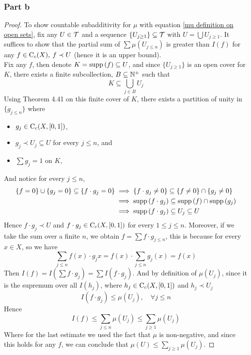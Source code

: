 \documentclass[../../main.tex]{subfiles}
\begin{document}
\subsubsection{Part b}
\begin{proof}
To show countable subadditivity for $\mu$ with equation \eqref{mu definition on open sets}, fix any $U\in\mathcal{T}$ and a sequence $\{U_{j\geq 1}\}\subseteq \mathcal{T}$ with $U = \bigcup U_{j\geq 1}$. It suffices to show that the partial sum of $\sum \mu(U_{j\leq n})$ is greater than $I(f)$ for any $f\in\operatorname{C}_c({X}),\:f\prec U$ (hence it is an upper bound).\\

Fix any $f$, then denote $K=\operatorname{supp}{(f)}\subseteq U$, and since $\{U_{j\geq 1}\}$ is an open cover for $K$, there exists a finite subcollection, $B\subseteq\mathbb{N}^+$ such that 
\[
K\subseteq \bigcup_{j\in B}U_j
\]
Using Theorem 4.41 on this finite cover of $K$, there exists a partition of unity in $\{g_{j\leq n}\}$ where
\begin{itemize}
    \item $g_j\in\operatorname{C}_c({X,[0,1]})$,
    \item $g_j\prec U_j\subseteq U$ for every $j\leq n$, and
    \item $\sum g_j=1$ on $K$,
\end{itemize}
And notice for every $j\leq n$, 
\begin{align*}
    \{f=0\}\cup\{g_j=0\}\subseteq \{f\cdot g_j=0\}&\implies\{f\cdot g_j\neq 0\}\subseteq \{f\neq 0\}\cap \{g_j\neq 0\}\\
    &\implies \operatorname{supp}{(f\cdot g_j)}\subseteq \operatorname{supp}{(f)}\cap \operatorname{supp}{(g_j)}\\
    &\implies \operatorname{supp}{(f\cdot g_j)}\subseteq U_j\subseteq U
\end{align*}
Hence $f\cdot g_j\prec U$ and $f\cdot g_j\in\operatorname{C}_c({X,[0,1]})$ for every $1\leq j\leq n$. Moreover, if we take the sum over a finite $n$, we obtain $f = \sum f\cdot g_{j\leq n}$, this is because for every $x\in X$, so we have 
\[
\sum_{j\leq n}f(x)\cdot g_j{x} = f(x)\cdot\sum_{j\leq n}g_j(x) = f(x)
\]
Then $I(f) = I(\sum f\cdot g_j) = \sum I(f\cdot g_j)$. And by definition of $\mu(U_j)$, since it is the supremum over all $I(h_j)$, where $h_j\in\operatorname{C}_c({X,[0,1]})$ and $h_j\prec U_j$
\[
I(f\cdot g_j)\leq \mu(U_j),\quad \forall j\leq n
\]
Hence
\[
I(f)\leq \sum_{j\leq n} \mu(U_j)\leq \sum_{j\geq 1}\mu(U_j)
\]
Where for the last estimate we used the fact that $\mu$ is non-negative, and since this holds for any $f$, we can conclude that $\mu(U)\leq \sum_{j\geq 1} \mu(U_j)$.
\end{proof}
\end{document}
